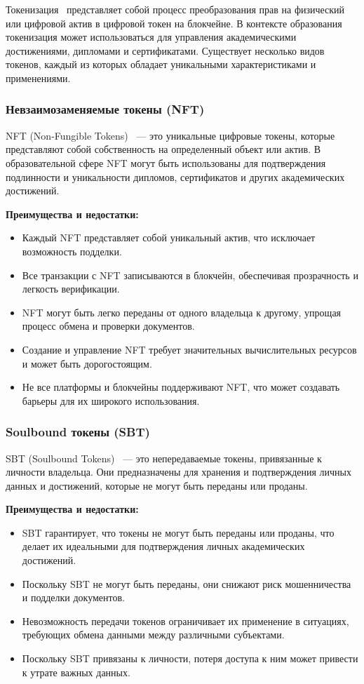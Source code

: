 Токенизация~\cite{bib:tokenizer} представляет собой процесс преобразования прав на физический или цифровой актив в цифровой токен на блокчейне. В контексте образования токенизация может использоваться для управления академическими достижениями, дипломами и сертификатами. Существует несколько видов токенов, каждый из которых обладает уникальными характеристиками и применениями.

\subsubsection{Невзаимозаменяемые токены (NFT)}

NFT (Non-Fungible Tokens)~\cite{bib:what_is_nft} --- это уникальные цифровые токены, которые представляют собой собственность на определенный объект или актив. В образовательной сфере NFT могут быть использованы для подтверждения подлинности и уникальности дипломов, сертификатов и других академических достижений.

\textbf{Преимущества и недостатки:}
\begin{itemize}
    \item Каждый NFT представляет собой уникальный актив, что исключает возможность подделки.
    \item Все транзакции с NFT записываются в блокчейн, обеспечивая прозрачность и легкость верификации.
    \item NFT могут быть легко переданы от одного владельца к другому, упрощая процесс обмена и проверки документов.
    \item Создание и управление NFT требует значительных вычислительных ресурсов и может быть дорогостоящим.
    \item Не все платформы и блокчейны поддерживают NFT, что может создавать барьеры для их широкого использования.
\end{itemize}

\subsubsection{Soulbound токены (SBT)}

SBT (Soulbound Tokens)~\cite{bib:what_is_sbt} --- это непередаваемые токены, привязанные к личности владельца. Они предназначены для хранения и подтверждения личных данных и достижений, которые не могут быть переданы или проданы.

\textbf{Преимущества и недостатки:}
\begin{itemize}
    \item SBT гарантирует, что токены не могут быть переданы или проданы, что делает их идеальными для подтверждения личных академических достижений.
    \item Поскольку SBT не могут быть переданы, они снижают риск мошенничества и подделки документов.
    \item Невозможность передачи токенов ограничивает их применение в ситуациях, требующих обмена данными между различными субъектами.
    \item Поскольку SBT привязаны к личности, потеря доступа к ним может привести к утрате важных данных.
\end{itemize}

